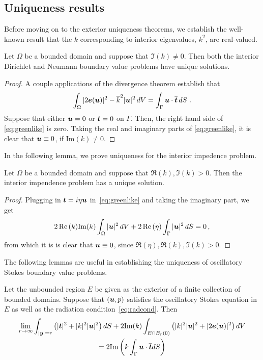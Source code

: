\subsection{Uniqueness results}

Before moving on to the exterior uniqueness theorems,
we establish the well-known result that
the $k$ corresponding to interior eigenvalues, $k^2$,
are real-valued.

\begin{thrm}
  Let $\Omega$ be a bounded domain and suppose that
  $\Im (k) \neq 0$. Then both the interior
  Dirichlet and Neumann boundary value problems have
  unique solutions.
\end{thrm}
\begin{proof}
  A couple applications of the divergence theorem establish
  that
  \begin{equation} \label{eq:greenlike}
    \int_\Omega |2{\boldsymbol e}({\boldsymbol u})|^2 - \overline{k}^2 |{\boldsymbol u}|^2 \, dV
    = \int_\Gamma {\boldsymbol u} \cdot \overline{{\boldsymbol t}} \, dS \; . 
  \end{equation}
  Suppose that either ${\boldsymbol u} = 0$ or ${\boldsymbol t} = 0$ on $\Gamma$.
  Then, the right hand side of \cref{eq:greenlike} is
  zero. 
  Taking the real and imaginary parts of \cref{eq:greenlike},
  it is clear that ${\boldsymbol u} \equiv 0$, if $\text{Im}(k) \neq 0$.
\end{proof}

In the following lemma, we prove uniqueness for the
interior impedence problem.

\begin{thrm}
  Let $\Omega$ be a bounded domain and suppose that
  $\Re(k),\Im (k) > 0$. Then the interior
  impendence problem has a unique solution.
\end{thrm}
\begin{proof}
  Plugging in ${\boldsymbol t} = i\eta {\boldsymbol u}$ in~\cref{eq:greenlike}
  and taking the imaginary part, we get
  \begin{equation}
   2 \operatorname{Re}{(k)} {\textrm{\textup{Im}}}{(k)} \int_{\Omega} |{\boldsymbol u}|^2\, dV + 2\operatorname{Re}{(\eta)} \int_{\Gamma}
   |{\boldsymbol u}|^2 \, dS = 0 \, ,
  \end{equation}
  from which it is is clear that ${\boldsymbol u} \equiv 0$, since
  $\Re{(\eta)}, \Re{(k)}, \Im{(k)} > 0$.
\end{proof}

The following lemmas are useful in establishing the uniqueness
of oscillatory Stokes boundary value problems.

\begin{lem}
  \label{lem:rep}
  Let the unbounded region $E$ be given as the exterior
  of a finite collection of bounded domains.
  Suppose that $({\boldsymbol u},p)$ satisfies the oscillatory Stokes equation in 
  $E$ as well as the radiation condition~\cref{eq:radcond}. 
  Then 
  \begin{multline}
    \label{eq:repinfest}  
    \lim_{r\to\infty}
    \int_{|{\boldsymbol y}|=r} \left( |{\boldsymbol t}|^2 + |k|^2 |{\boldsymbol u}|^2 \right) dS +
    2 {\textrm{\textup{Im}}}(k) \int_{E \cap B_{r}(0)} \left(|k|^2 |{\boldsymbol u}|^2 + |2{\boldsymbol e}({\boldsymbol u})|^2 \right)
    dV \\
    = 2 {\textrm{\textup{Im}}} \left( k \int_{\Gamma} {\boldsymbol u} \cdot
\overline{{\boldsymbol t}} dS  \right) 
  \end{multline}
  
\end{lem}

